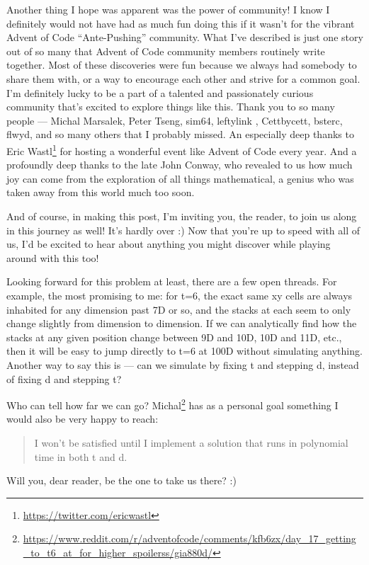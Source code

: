 \documentclass[]{article}
\renewcommand{\href}[2]{#2\footnote{\url{#1}}}
\begin{document}
Another thing I hope was apparent was the power of community! I know I
definitely would not have had as much fun doing this if it wasn't for the
vibrant Advent of Code ``Ante-Pushing'' community. What I've described is just
one story out of so many that Advent of Code community members routinely write
together. Most of these discoveries were fun because we always had somebody to
share them with, or a way to encourage each other and strive for a common goal.
I'm definitely lucky to be a part of a talented and passionately curious
community that's excited to explore things like this. Thank you to so many
people --- Michal Marsalek, Peter Tseng, sim64, leftylink , Cettbycett, bsterc,
flwyd, and so many others that I probably missed. An especially deep thanks to
\href{https://twitter.com/ericwastl}{Eric Wastl} for hosting a wonderful event
like Advent of Code every year. And a profoundly deep thanks to the late John
Conway, who revealed to us how much joy can come from the exploration of all
things mathematical, a genius who was taken away from this world much too soon.

And of course, in making this post, I'm inviting you, the reader, to join us
along in this journey as well! It's hardly over :) Now that you're up to speed
with all of us, I'd be excited to hear about anything you might discover while
playing around with this too!

Looking forward for this problem at least, there are a few open threads. For
example, the most promising to me: for t=6, the exact same xy cells are always
inhabited for any dimension past 7D or so, and the stacks at each seem to only
change slightly from dimension to dimension. If we can analytically find how the
stacks at any given position change between 9D and 10D, 10D and 11D, etc., then
it will be easy to jump directly to t=6 at 100D without simulating anything.
Another way to say this is --- can we simulate by fixing t and stepping d,
instead of fixing d and stepping t?

Who can tell how far we can go?
\href{https://www.reddit.com/r/adventofcode/comments/kfb6zx/day_17_getting_to_t6_at_for_higher_spoilerss/gia880d/}{Michal}
has as a personal goal something I would also be very happy to reach:

\begin{quote}
I won't be satisfied until I implement a solution that runs in polynomial time
in both t and d.
\end{quote}

Will you, dear reader, be the one to take us there? :)
\end{document}
